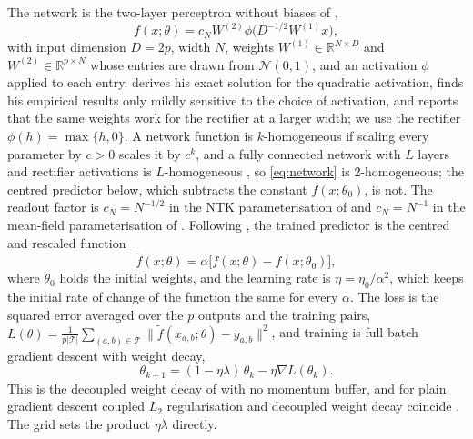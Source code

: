 \documentclass[a4paper,11pt]{article} %
\begin{document}
The network is the two-layer perceptron without biases of
\citet{gromovGrokkingModularArithmetic2023},
\begin{equation}
  f(x;\theta) = c_N W^{(2)} \phi\bigl(D^{-1/2} W^{(1)} x\bigr),
  \label{eq:network}
\end{equation}
with input dimension $D=2p$, width $N$, weights
$W^{(1)}\in\mathbb{R}^{N\times D}$ and $W^{(2)}\in\mathbb{R}^{p\times N}$
whose entries are drawn from $\mathcal{N}(0,1)$, and an activation $\phi$
applied to each entry.  derives
his exact solution for the quadratic activation, finds his empirical results
only mildly sensitive to the choice of activation, and reports that the same
weights work for the rectifier at a larger width; we use the rectifier
$\phi(h)=\max\{h,0\}$. A network function is $k$-homogeneous if scaling every
parameter by $c>0$ scales it by $c^k$, and a fully connected network with $L$
layers and rectifier activations is $L$-homogeneous
\citep{lewkowyczTrainingDynamicsDeep2021}, so \eqref{eq:network} is
2-homogeneous; the centred predictor below, which subtracts the constant
$f(x;\theta_0)$, is not. The readout factor is
$c_N=N^{-1/2}$ in the NTK parameterisation of
\citet{jacotNeuralTangentKernel2020} and $c_N=N^{-1}$ in the mean-field
parameterisation of \citet{gromovGrokkingModularArithmetic2023}. Following
\citet{kumarGrokkingTransitionLazy2024}, the trained predictor is the centred
and rescaled function
\begin{equation}
  \tilde f(x;\theta) = \alpha\bigl[f(x;\theta)-f(x;\theta_0)\bigr],
\end{equation}
where $\theta_0$ holds the initial weights, and the learning rate is
$\eta=\eta_0/\alpha^2$, which keeps the initial rate of change of the function
the same for every $\alpha$. The loss is the squared error averaged over the
$p$ outputs and the training pairs,
$L(\theta)=\frac{1}{p\lvert\mathcal{T}\rvert}\sum_{(a,b)\in\mathcal{T}}
\lVert\tilde f(x_{a,b};\theta)-y_{a,b}\rVert^2$, and training is full-batch
gradient descent with weight decay,
\begin{equation}
  \theta_{k+1} = (1-\eta\lambda)\,\theta_k - \eta\nabla L(\theta_k).
\end{equation}
This is the decoupled weight decay of
\citet{kimGrokkingWeightDecayClock2026} with no momentum buffer, and for plain
gradient descent coupled $L_2$ regularisation and decoupled weight decay
coincide \citep{kimGrokkingWeightDecayClock2026}. The grid sets the product
$\eta\lambda$ directly.
\end{document}
